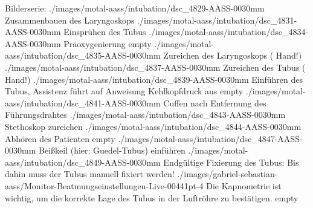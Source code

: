 \begin{PictureSeriesWide}{}{Bilderserie:  }
{./images/motal-aass/intubation/dsc_4829-AASS-0030mm}
{Zusammenbauen des Laryngoskops}
{./images/motal-aass/intubation/dsc_4831-AASS-0030mm}
{Einsprühen des Tubus }
{./images/motal-aass/intubation/dsc_4834-AASS-0030mm}
{Präoxygenierung}
{empty}
{}
{./images/motal-aass/intubation/dsc_4835-AASS-0030mm}
{Zureichen des Laryngoskops ( Hand!)}
{./images/motal-aass/intubation/dsc_4837-AASS-0030mm}
{Zureichen des Tubus ( Hand!)}
{./images/motal-aass/intubation/dsc_4839-AASS-0030mm}
{Einführen des Tubus, Assistenz führt auf Anweisung Kehlkopfdruck aus}
{empty}
{}
{./images/motal-aass/intubation/dsc_4841-AASS-0030mm}
{Cuffen nach Entfernung des Führungsdrahtes}
{./images/motal-aass/intubation/dsc_4843-AASS-0030mm}
{Stethoskop zureichen}
{./images/motal-aass/intubation/dsc_4844-AASS-0030mm}
{Abhören des Patienten}
{empty}
{}
{./images/motal-aass/intubation/dsc_4847-AASS-0030mm}
{Beißkeil (hier: Guedel-Tubus) einführen}
{./images/motal-aass/intubation/dsc_4849-AASS-0030mm}
{Endgültige Fixierung des Tubus: Bis dahin muss der Tubus manuell fixiert werden!}
{./images/gabriel-sebastian-aass/Monitor-Beatmungseinstellungen-Live-00441pt-4}
{Die Kapnometrie ist wichtig, um die korrekte Lage des Tubus in der Luftröhre zu bestätigen. }
{empty}
{}
\end{PictureSeriesWide}

\normalfont

\begin{Literary}


\end{Literary}



\nocite{ZechaOpGehilfe1}
\ChapterEnd